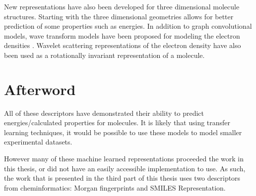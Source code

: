 New representations have also been developed for three dimensional molecule structures.  Starting with the three dimensional geometries allows for better prediction of some properties such as energies. In addition to graph convolutional models, wave transform models have been proposed for modeling the electron densities \cite{kuzminykh20183d}.
Wavelet scattering representations of the electron density have also been used as a rotationally invariant representation of a molecule\cite{eickenberg2017solid}.

\section{Afterword}

All of these descriptors have demonstrated their ability to predict energies/calculated properties for molecules. It is likely that using transfer learning techniques, it would be possible to use these models to model smaller experimental datasets.

However many of these machine learned representations proceeded the work in this thesis, or did not have an easily accessible implementation to use. As such, the work that is presented in the third part of this thesis uses two descriptors from cheminformatics: Morgan fingerprints and SMILES Representation.
